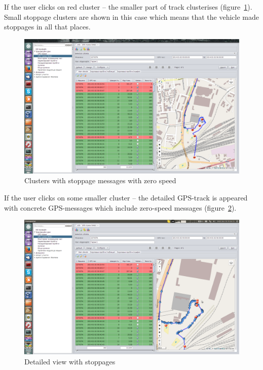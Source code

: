 \newpage
If the user clicks on red cluster -- the smaller part of track clusterises (figure~\ref{fig:14}). Small stoppage clusters are shown in this case which means that the vehicle made stoppages in all that places.

\begin{figure}[H]
\centering
\includegraphics[width=\linewidth]{chapters/02-gpstracks/images/14-clusters-with-stoppage-messages-with-zero-speed.png}
\caption{Clusters with stoppage messages with zero speed}\label{fig:14}
\end{figure}

\newpage
If the user clicks on some smaller cluster -- the detailed GPS-track is appeared with concrete GPS-messages which include zero-speed messages (figure~\ref{fig:15}).

\begin{figure}[H]
\centering
\includegraphics[width=\linewidth]{chapters/02-gpstracks/images/15-detailed-view-with-stoppages.png}
\caption{Detailed view with stoppages}\label{fig:15}
\end{figure}

